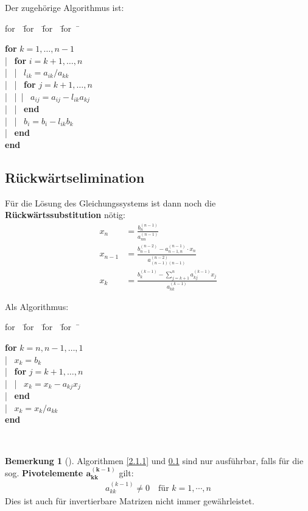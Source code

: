 \documentclass[ngerman,fontsize=11pt, paper=a4, parskip=half, titlepage=true, toc=bib]{scrbook}
\theoremstyle{definition}
\newtheorem{Bem}[Def]{Bemerkung}	%
\theoremstyle{plain}
\newcommand{\subsectione}[1]{\addtocounter{Def}{1}\subsection{#1}}
\newenvironment{Beme}[1][]{ %
  \begin{Bem}[#1]
  }
  {
  \end{Bem}
  \addtocounter{subsection}{1}
}
\newenvironment{pseudocode}[1]{ %
  \begin{minipage}{#1}
    \begin{framed}
      \hspace*{1em}	
      \begin{minipage}{#1}
        \begin{tabbing}
          for~~\= for~~\= for~~\= for~~\= \kill
	}
	{ %
        \end{tabbing}
      \end{minipage}
      \hspace*{1em}
    \end{framed}
  \end{minipage}
}
\begin{document}
Der zugehörige Algorithmus ist:

\begin{pseudocode}{0.5\linewidth}
  \textbf{for} $ k = 1, \dots , n-1$\\
  |~	\> \textbf{for} $i = k + 1, \dots , n$ \\
  |~	\> |~\> $l_{ik} = a_{ik} /a_{kk}$\\
  |~	\> |~\> \textbf{for} $j = k + 1, \dots , n$ \\
  |~	\> |~\>|~\> $a_{ij} = a_{ij} - l_{ik} a_{kj} $\\
  |~	\> |~\> \textbf{end}\\
  |~	\> |~\> $b_i = b_i -  l_{ik} b_k $\\
  |~	\> \textbf{end} \\
  \textbf{end}
\end{pseudocode}

\subsectione{Rückwärtselimination}\label{2.1.2}
Für die Lösung des Gleichungssystems ist dann noch die
\textbf{Rückwärtssubstitution}  nötig:
\begin{align}
  x_n &= \frac{b_n^{(n-1)}}{a_{nn}^{(n-1)}} \label{II.1.5} \\
  x_{n-1} &=  \frac{b_{n-1}^{(n-2)}-a_{n-1,n}^{(n-1)}\cdot x_n}
            {a_{(n-1)(n-1)}^{(n-2)}} \label{II.1.6} \\
  x_k &= \frac{b_k^{(k-1)}-\sum_{j=k+1}^{n}a_{kj}^{(k-1)}x_j}
        {a_{kk}^{(k-1)}} \label{II.1.7}
\end{align}

Als Algorithmus:

\begin{pseudocode}{0.5\linewidth}
  \textbf{for} $k = n, n -1, \dots , 1$ \\
  |~		\>$x_k = b_k$ \\
  |~		\>\textbf{for} $j = k + 1, \dots , n$ \\
  |~		\>|~	$x_k = x_k - a_{kj}x_j$ \\
  |~		\>\textbf{end} \\
  |~		\>$x_k = x_k /a_{kk}$ \\
  \textbf{end}
\end{pseudocode}~\\

\begin{Beme}
  Algorithmen \ref{2.1.1} und \ref{2.1.2} sind nur ausführbar,
  falls für die sog. \textbf{Pivotelemente $\mathbf{a_{kk}^{(k-1)}}$ }  gilt:
  \begin{gather*}
    a_{kk}^{(k-1)} \neq 0 \quad   \text{für } k=1, \cdots , n
  \end{gather*}
  Dies ist auch für invertierbare Matrizen nicht immer gewährleistet.
\end{Beme}
\end{document}
